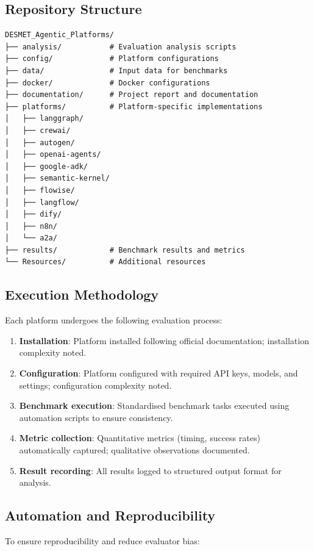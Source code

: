 \documentclass[]
{UCD_CS_FYP_Report}
\begin{document}
\subsection{Repository Structure}

\begin{verbatim}
DESMET_Agentic_Platforms/
├── analysis/           # Evaluation analysis scripts
├── config/             # Platform configurations
├── data/               # Input data for benchmarks
├── docker/             # Docker configurations
├── documentation/      # Project report and documentation
├── platforms/          # Platform-specific implementations
│   ├── langgraph/
│   ├── crewai/
│   ├── autogen/
│   ├── openai-agents/
│   ├── google-adk/
│   ├── semantic-kernel/
│   ├── flowise/
│   ├── langflow/
│   ├── dify/
│   ├── n8n/
│   └── a2a/
├── results/            # Benchmark results and metrics
└── Resources/          # Additional resources
\end{verbatim}

\subsection{Execution Methodology}

Each platform undergoes the following evaluation process:

\begin{enumerate}
  \item \textbf{Installation}: Platform installed following official documentation; installation complexity noted.
  \item \textbf{Configuration}: Platform configured with required API keys, models, and settings; configuration complexity noted.
  \item \textbf{Benchmark execution}: Standardised benchmark tasks executed using automation scripts to ensure consistency.
  \item \textbf{Metric collection}: Quantitative metrics (timing, success rates) automatically captured; qualitative observations documented.
  \item \textbf{Result recording}: All results logged to structured output format for analysis.
\end{enumerate}

\subsection{Automation and Reproducibility}

To ensure reproducibility and reduce evaluator bias:
\end{document}
